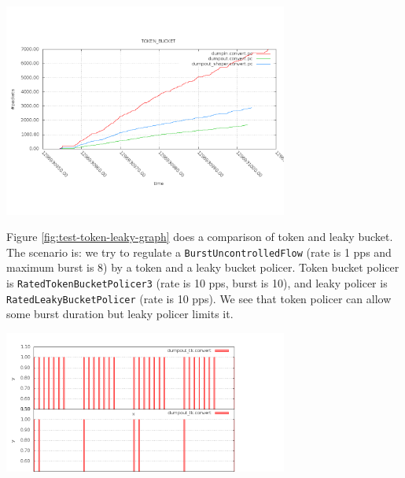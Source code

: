 \documentclass[a4paper]{article}
\begin{document}
  \begin{center}
	\includegraphics[width=0.7\textwidth]{token-count.png}
	\label{fig:test-tokenpolicer-graph}
  \end{center} 

  Figure \ref{fig:test-token-leaky-graph} does a comparison of token and leaky bucket. The scenario is: we try to regulate a \texttt{BurstUncontrolledFlow}  (rate is 1 pps and maximum burst is 8) by a token and a leaky bucket policer. Token bucket policer is \texttt{RatedTokenBucketPolicer3} (rate is 10 pps, burst is 10), and leaky policer is \texttt{RatedLeakyBucketPolicer} (rate is 10 pps). We see that token policer can allow some burst duration but leaky policer limits it.
  \begin{center}
	\includegraphics[width=0.7\textwidth]{compare-lk-tk.png}
	\label{fig:test-token-leaky-graph}
  \end{center} 
  
\end{document}
